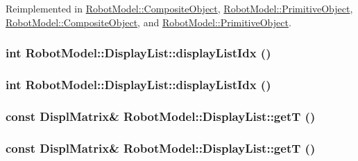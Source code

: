 Reimplemented in \hyperlink{class_robot_model_1_1_composite_object_adadc29cccbba9cb615eaf0ad2fbdd337}{RobotModel::CompositeObject}, \hyperlink{class_robot_model_1_1_primitive_object_a69c30287deb6549fbde68d1ba37424a8}{RobotModel::PrimitiveObject}, \hyperlink{class_robot_model_1_1_composite_object_a7c46e273df7d93cb51b9e16158469509}{RobotModel::CompositeObject}, and \hyperlink{class_robot_model_1_1_primitive_object_aa490f6642a6a02d48cf8ed9cd49a47f7}{RobotModel::PrimitiveObject}.\hypertarget{class_robot_model_1_1_display_list_a2c405729d9a5d904b9c292fd87c3be05}{
\subsubsection[{displayListIdx}]{\setlength{\rightskip}{0pt plus 5cm}int RobotModel::DisplayList::displayListIdx ()}}
\label{class_robot_model_1_1_display_list_a2c405729d9a5d904b9c292fd87c3be05}
\hypertarget{class_robot_model_1_1_display_list_a2c405729d9a5d904b9c292fd87c3be05}{
\subsubsection[{displayListIdx}]{\setlength{\rightskip}{0pt plus 5cm}int RobotModel::DisplayList::displayListIdx ()}}
\label{class_robot_model_1_1_display_list_a2c405729d9a5d904b9c292fd87c3be05}
\hypertarget{class_robot_model_1_1_display_list_a2e08e72148fc8bb77a693b769a16711a}{
\subsubsection[{getT}]{\setlength{\rightskip}{0pt plus 5cm}const {\bf DisplMatrix}\& RobotModel::DisplayList::getT ()}}
\label{class_robot_model_1_1_display_list_a2e08e72148fc8bb77a693b769a16711a}
\hypertarget{class_robot_model_1_1_display_list_a2e08e72148fc8bb77a693b769a16711a}{
\subsubsection[{getT}]{\setlength{\rightskip}{0pt plus 5cm}const {\bf DisplMatrix}\& RobotModel::DisplayList::getT ()}}
